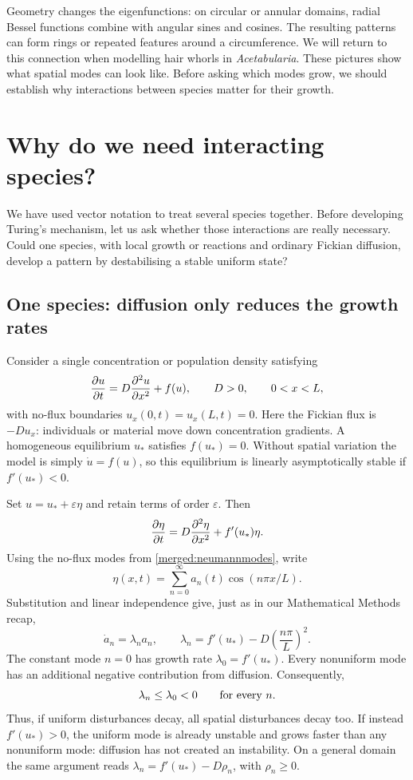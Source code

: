 \documentclass[main.tex]{subfiles}
\begin{document}
Geometry changes the eigenfunctions: on circular or annular domains, radial Bessel functions combine with angular sines and cosines. The resulting patterns can form rings or repeated features around a circumference. We will return to this connection when modelling hair whorls in \emph{Acetabularia}. These pictures show what spatial modes can look like. Before asking which modes grow, we should establish why interactions between species matter for their growth.


\section{Why do we need interacting species?}\label{merged:scalarbridge}
We have used vector notation to treat several species together. Before developing Turing's mechanism, let us ask whether those interactions are really necessary. Could one species, with local growth or reactions and ordinary Fickian diffusion, develop a pattern by destabilising a stable uniform state?

\subsection*{One species: diffusion only reduces the growth rates}
Consider a single concentration or population density satisfying
\begin{equation}\label{merged:scalarRD}
\pd{u}{t}=D\pdd{u}{x}+f(u),\qquad D>0,\qquad 0<x<L,
\end{equation}
with no-flux boundaries $u_x(0,t)=u_x(L,t)=0$. Here the Fickian flux is $-D u_x$: individuals or material move down concentration gradients. A homogeneous equilibrium $u_*$ satisfies $f(u_*)=0$. Without spatial variation the model is simply $\dot u=f(u)$, so this equilibrium is linearly asymptotically stable if $f'(u_*)<0$.

Set $u=u_*+\varepsilon\eta$ and retain terms of order $\varepsilon$. Then
\[
\pd{\eta}{t}=D\pdd{\eta}{x}+f'(u_*)\eta.
\]
Using the no-flux modes from \cref{merged:neumannmodes}, write
\[
\eta(x,t)=\sum_{n=0}^{\infty}a_n(t)\cos(n\pi x/L).
\]
Substitution and linear independence give, just as in our Mathematical Methods recap,
\begin{equation}\label{merged:scalarnoturing}
\dot a_n=\lambda_n a_n,\qquad
\lambda_n=f'(u_*)-D\left(\frac{n\pi}{L}\right)^2.
\end{equation}
The constant mode $n=0$ has growth rate $\lambda_0=f'(u_*)$. Every nonuniform mode has an additional negative contribution from diffusion. Consequently,
\[
\lambda_n\leq\lambda_0<0\qquad\hbox{for every }n.
\]
Thus, if uniform disturbances decay, all spatial disturbances decay too. If instead $f'(u_*)>0$, the uniform mode is already unstable and grows faster than any nonuniform mode: diffusion has not created an instability. On a general domain the same argument reads $\lambda_n=f'(u_*)-D\rho_n$, with $\rho_n\geq0$.
\end{document}

